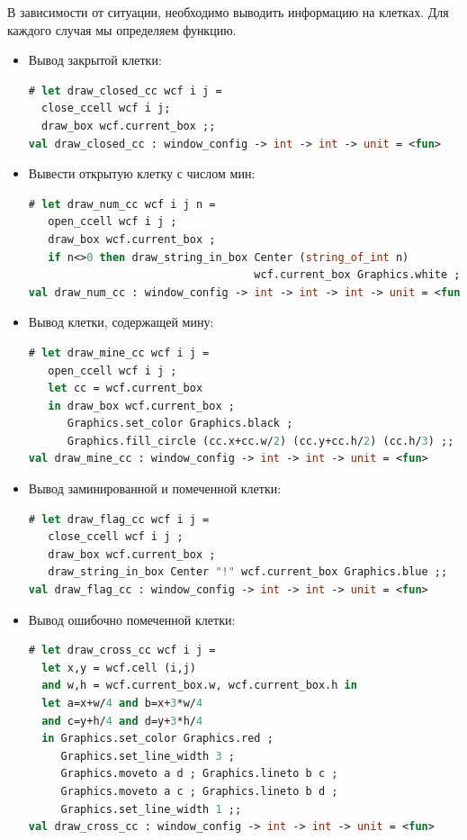 В зависимости от ситуации, необходимо выводить информацию на клетках. Для 
каждого случая мы определяем функцию.

\begin{itemize}
	\item Вывод закрытой клетки:

\begin{lstlisting}[language=OCaml]
# let draw_closed_cc wcf i j =
  close_ccell wcf i j;
  draw_box wcf.current_box ;;
val draw_closed_cc : window_config -> int -> int -> unit = <fun>
\end{lstlisting}

	\item Вывести открытую клетку с числом мин:

\begin{lstlisting}[language=OCaml]
# let draw_num_cc wcf i j n =
   open_ccell wcf i j ;
   draw_box wcf.current_box ;
   if n<>0 then draw_string_in_box Center (string_of_int n) 
                                   wcf.current_box Graphics.white ;;
val draw_num_cc : window_config -> int -> int -> int -> unit = <fun>
\end{lstlisting}

	\item Вывод клетки, содержащей мину:

\begin{lstlisting}[language=OCaml]
# let draw_mine_cc wcf i j = 
   open_ccell wcf i j ;
   let cc = wcf.current_box 
   in draw_box wcf.current_box ;
      Graphics.set_color Graphics.black ; 
      Graphics.fill_circle (cc.x+cc.w/2) (cc.y+cc.h/2) (cc.h/3) ;;
val draw_mine_cc : window_config -> int -> int -> unit = <fun>
\end{lstlisting}

	\item Вывод заминированной и помеченной клетки:

\begin{lstlisting}[language=OCaml]
# let draw_flag_cc wcf i j =
   close_ccell wcf i j ;
   draw_box wcf.current_box ;
   draw_string_in_box Center "!" wcf.current_box Graphics.blue ;;
val draw_flag_cc : window_config -> int -> int -> unit = <fun>
\end{lstlisting}

	\item Вывод ошибочно помеченной клетки: 

\begin{lstlisting}[language=OCaml]
# let draw_cross_cc wcf i j =
  let x,y = wcf.cell (i,j)
  and w,h = wcf.current_box.w, wcf.current_box.h in
  let a=x+w/4 and b=x+3*w/4 
  and c=y+h/4 and d=y+3*h/4 
  in Graphics.set_color Graphics.red ;
     Graphics.set_line_width 3 ;
     Graphics.moveto a d ; Graphics.lineto b c ;
     Graphics.moveto a c ; Graphics.lineto b d ;
     Graphics.set_line_width 1 ;;
val draw_cross_cc : window_config -> int -> int -> unit = <fun>
\end{lstlisting}

\end{itemize}

